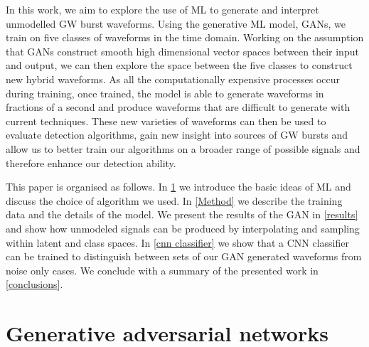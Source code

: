 \documentclass[12pt]{iopart}
\begin{document}
%
In this work, we aim to explore the use of \ac{ML} to generate and interpret
unmodelled GW burst waveforms. Using the generative \ac{ML}
model, \acp{GAN}, we train on five classes of waveforms in the time domain. Working on the assumption that \acp{GAN} construct smooth
 high dimensional vector spaces between their input and output, we can then
explore the space between the five classes to construct new
hybrid waveforms. As all the computationally expensive
processes occur during training, once trained, the model is able to
generate waveforms in fractions of a second and produce waveforms that are difficult to generate with current
techniques. These new varieties of waveforms can then be used to evaluate
detection algorithms, gain new insight into sources of GW
bursts and  allow us to better train our algorithms on a
broader range of possible signals and therefore enhance our detection ability. 

%
This paper is organised as follows. In \cref{ML overview} we introduce the basic ideas of \ac{ML} and discuss the choice of algorithm we used. In \cref{Method} we describe the training data and the details of the model. We present the results of the GAN in \cref{results} and show how unmodeled signals can be produced by interpolating and sampling within latent and class spaces. In \cref{cnn classifier} we show that a \ac{CNN} classifier can be trained to distinguish between sets of our \ac{GAN} generated waveforms from noise only cases. We conclude with a summary of the presented work in \cref{conclusions}.

\section{Generative adversarial networks} \label{ML overview}
\end{document}

